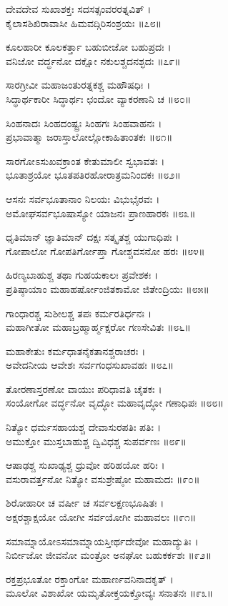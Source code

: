 ದೇವದೇವ ಸುಖಾಶಕ್ತಃ ಸದಸತ್ಸಂವರರತ್ನವಿತ್ ।\\
ಕೈಲಾಸಶಿಖಿರಾವಾಸೀ ಹಿಮವದ್ಗಿರಿಸಂಶ್ರಯಃ ॥೭೮॥

ಕೂಲಹಾರೀ ಕೂಲಕರ್ತ್ತಾ ಬಹುಬೀಜೋ ಬಹುಪ್ರದಃ ।\\
ವನಿಜೋ ವರ್ದ್ಧನೋ ದಕ್ಷೋ ನಕುಲಶ್ಚದನಶ್ಛದಃ ॥೭೯॥

ಸಾರಗ್ರೀವೀ ಮಹಾಜಂತುರತ್ನಕಶ್ಚ ಮಹೌಷಧಿಃ ।\\
ಸಿದ್ಧಾರ್ಥಕಾರೀ ಸಿದ್ಧಾರ್ಥಃ ಛಂದೋ ವ್ಯಾಕರಣಾನಿ ಚ ॥೮೦॥

ಸಿಂಹನಾದಃ ಸಿಂಹದಂಷ್ಟ್ರಃ ಸಿಂಹಗಃ ಸಿಂಹವಾಹನಃ ।\\
ಪ್ರಭಾವಾತ್ಮಾ ಜರಾಸ್ತಾಲೋಲ್ಲೋಕಾಹಿತಾಂತಕಃ ॥೮೧॥

ಸಾರಗೋಽಸುಖವಕ್ರಾಂತ ಕೇತುಮಾಲೀ ಸ್ವಭಾವತಃ ।\\
ಭೂತಾಶ್ರಯೋ ಭೂತಪತಿರಹೋರಾತ್ರಮನಿಂದಕಃ ॥೮೨॥

ಆಸನಃ ಸರ್ವಭೂತಾನಾಂ ನಿಲಯಃ ವಿಭುಭೈರವಃ ।\\
ಅಮೋಘಸರ್ವಭೂಷಾಸ್ಯೋ ಯಾಜನಃ ಪ್ರಾಣಹಾರಕಃ ॥೮೩॥

ಧೃತಿಮಾನ್ ಜ್ಞಾತಿಮಾನ್ ದಕ್ಷಃ ಸತ್ಕೃತಶ್ಚ ಯುಗಾಧಿಪಃ ।\\
ಗೋಪಾಲೋ ಗೋಪತಿರ್ಗೋಪ್ತಾ ಗೋಶ್ಚವಸನೋ ಹರಃ ॥೮೪॥

ಹಿರಣ್ಯಬಾಹುಶ್ಚ ತಥಾ ಗುಹಯಕಾಲಃ ಪ್ರವೇಶಕಃ ।\\
ಪ್ರತಿಷ್ಠಾಯಾಂ ಮಹಾಹರ್ಷೋಂಜಿತಕಾಮೋ ಜಿತೇಂದ್ರಿಯಃ ॥೮೫॥

ಗಾಂಧಾರಶ್ಚ ಸುಶೀಲಶ್ಚ ತಪಃ ಕರ್ಮರತಿರ್ಧನಃ ।\\
ಮಹಾಗೀತೋ ಮಹಾಬ್ರಹ್ಮಾರ್ಹ್ಮಕ್ಷರೋ ಗಣಸೇವಿತಃ ॥೮೬॥

ಮಹಾಕೇತುಃ ಕರ್ಮಧಾತನೈಕತಾನಶ್ಚರಾಚರಃ ।\\
ಅವೇದನೀಯ ಆವೇಶಃ ಸರ್ವಗಂಧಸುಖಾವಹಃ ॥೮೭॥

ತೋರಣಾಸ್ತರಣೋ ವಾಯುಃ ಪರಿಧಾವತಿ ಚೈತಕಃ ।\\
ಸಂಯೋಗೋ ವರ್ದ್ಧನೋ ವೃದ್ಧೋ ಮಹಾವೃದ್ಧೋ ಗಣಾಧಿಪಃ ॥೮೮॥

ನಿತ್ಯೋ ಧರ್ಮಸಹಾಯಶ್ಚ ದೇವಾಸುರಪತಿಃ ಪತಿಃ ।\\
ಅಮುಕ್ತೋ ಮುಸ್ತಬಾಹುಶ್ಚ ದ್ವಿವಿಧಶ್ಚ ಸುಪರ್ವಣಃ ॥೮೯॥

ಆಷಾಢಶ್ಚ ಸುಖಾಢ್ಯಶ್ಚ ಧ್ರುವೋ ಹರಿಹಯೋ ಹರಿಃ ।\\
ವಸುರಾವರ್ತ್ತನೋ ನಿತ್ಯೋ ವಸುಶ್ರೇಷ್ಠೋ ಮಹಾಮದಃ ॥೯೦॥

ಶಿರೋಹಾರೀ ಚ ವರ್ಷೀ ಚ ಸರ್ವಲಕ್ಷಣಭೂಷಿತಃ ।\\
ಅಕ್ಷರಶ್ಚಾಕ್ಷಯೋ ಯೋಗೀ ಸರ್ವಯೋಗೀ ಮಹಾವಲಃ ॥೯೧॥

ಸಮಾಮ್ನಾಯೋಽಸಮಾಮ್ನಾಯಸ್ತೀರ್ಥದೇವೋ ಮಹಾದ್ಯುತಿಃ ।\\
ನಿರ್ಬೀಜೋ ಜೀವನೋ ಮಂತ್ರೋ ಅನಘೋ ಬಹುಕರ್ಕಶಃ ॥೯೨॥

ರಕ್ತಪ್ರಭೂತೋ ರಕ್ತಾಂಗೋ ಮಹಾರ್ಣವನಿನಾದಕೃತ್ ।\\
ಮೂಲೋ ವಿಶಾಖೋ ಯಮೃತೋಕ್ತಯಕ್ತೋವ್ಯಃ ಸನಾತನಃ ॥೯೩॥

